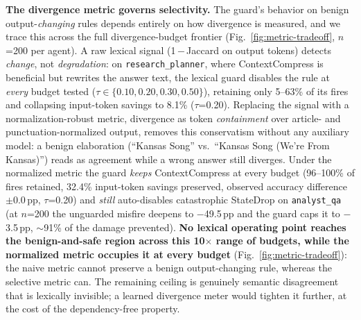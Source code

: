 \textbf{The divergence metric governs selectivity.} The guard's behavior on benign
output-\textit{changing} rules depends entirely on how divergence is measured, and we trace
this across the full divergence-budget frontier (Fig.~\ref{fig:metric-tradeoff}, $n$=200 per
agent). A raw lexical signal (1\,$-$\,Jaccard on output tokens) detects \textit{change}, not
\textit{degradation}: on \texttt{research\_planner}, where ContextCompress is beneficial but
rewrites the answer text, the lexical guard disables the rule at \textit{every} budget
tested ($\tau\in\{0.10,0.20,0.30,0.50\}$), retaining only 5--63\% of its fires and
collapsing input-token savings to 8.1\% ($\tau$=0.20). Replacing the signal with a
normalization-robust metric, divergence as token \textit{containment} over article- and
punctuation-normalized output, removes this conservatism without any auxiliary model: a
benign elaboration (``Kansas Song'' vs.\ ``Kansas Song (We're From Kansas)'') reads as
agreement while a wrong answer still diverges. Under the normalized metric the guard
\textit{keeps} ContextCompress at every budget (96--100\% of fires retained, 32.4\%
input-token savings preserved, observed accuracy difference $\pm$0.0\,pp, $\tau$=0.20) and
\textit{still} auto-disables catastrophic StateDrop on \texttt{analyst\_qa} (at $n$=200 the
unguarded misfire deepens to $-$49.5\,pp and the guard caps it to $-$3.5\,pp, $\sim$91\% of
the damage prevented). \textbf{No lexical operating point reaches the benign-and-safe region
across this 10$\times$ range of budgets, while the normalized metric occupies it at every
budget} (Fig.~\ref{fig:metric-tradeoff}): the naive metric cannot preserve a benign
output-changing rule, whereas the selective metric can. The remaining ceiling is genuinely
semantic disagreement that is lexically invisible; a learned divergence meter would tighten
it further, at the cost of the dependency-free property.

